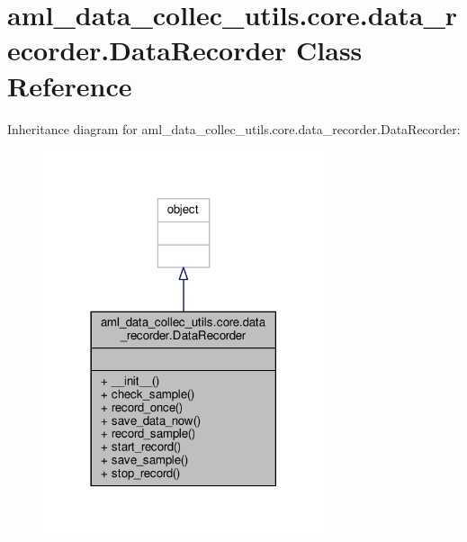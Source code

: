 \hypertarget{classaml__data__collec__utils_1_1core_1_1data__recorder_1_1_data_recorder}{\section{aml\-\_\-data\-\_\-collec\-\_\-utils.\-core.\-data\-\_\-recorder.\-Data\-Recorder Class Reference}
\label{classaml__data__collec__utils_1_1core_1_1data__recorder_1_1_data_recorder}
}


Inheritance diagram for aml\-\_\-data\-\_\-collec\-\_\-utils.\-core.\-data\-\_\-recorder.\-Data\-Recorder\-:
\nopagebreak
\begin{figure}[H]
\begin{center}
\leavevmode
\includegraphics[width=234pt]{classaml__data__collec__utils_1_1core_1_1data__recorder_1_1_data_recorder__inherit__graph}
\end{center}
\end{figure}



